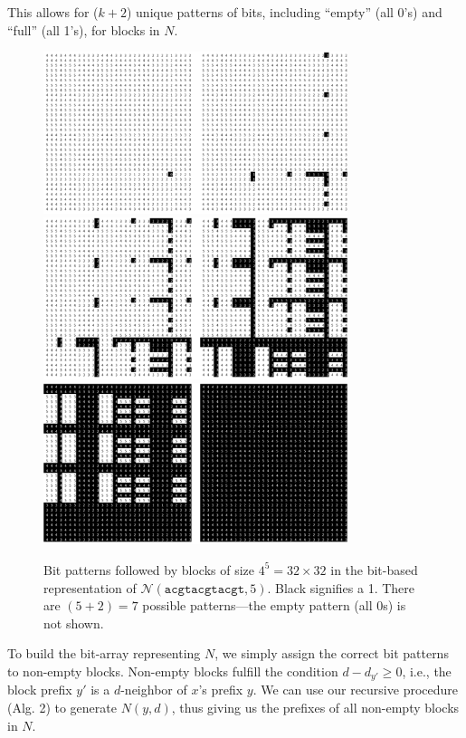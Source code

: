 \documentclass[conference]{IEEEtran}
\begin{document}
\begin{enumerate}[label={\em \arabic*.}]
			This allows for ($k + 2$) unique patterns of bits, including ``empty'' (all 0's) and ``full'' (all 1's), for blocks in $N$.\newline
			\begin{figure}[h]
				\centering
				\label{fig:bit_patterns}
				\includegraphics[width=3.5in]{img/0-1}\vspace*{5pt}
				\includegraphics[width=3.5in]{img/2-3}\vspace*{5pt}
				\includegraphics[width=3.5in]{img/4-5}
				\caption{Bit patterns followed by blocks of size $4^{5}=32\times32$ in the bit-based representation of $\mathcal{N}(\texttt{acgtacgtacgt},5)$. Black signifies a 1. There are $(5+2)=7$ possible patterns---the empty pattern (all 0s) is not shown.}
				\end{figure}
			\newpage
			To build the bit-array representing $N$, we simply assign the correct bit patterns to non-empty blocks. Non-empty blocks fulfill the condition $d-d_{y'} \geq 0$, i.e., the block prefix $y'$ is a $d$-neighbor of $x$'s prefix $y$. We can use our recursive procedure (Alg. 2) to generate $N(y,d)$, thus giving us the prefixes of all non-empty blocks in $N$.


\end{enumerate}
\end{document}
